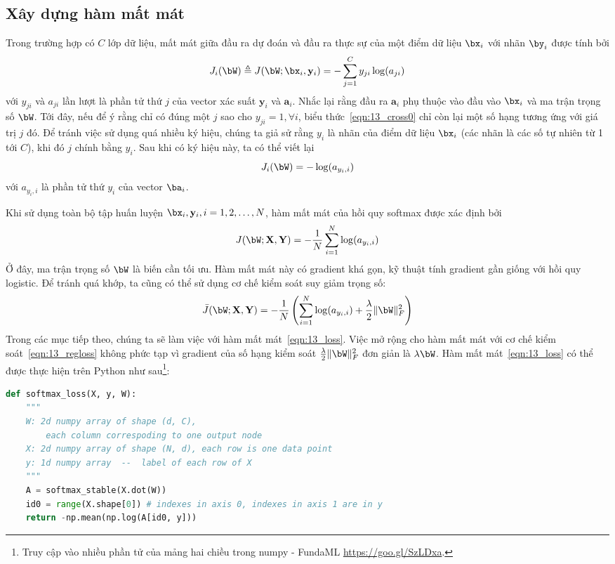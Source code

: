 \subsection{Xây dựng hàm mất mát} 
Trong trường hợp có $C$ lớp dữ liệu, {mất mát} giữa
đầu ra dự đoán và đầu ra thực sự của một điểm dữ liệu $\bx_i$ với
nhãn $\by_i$ được tính bởi
\begin{equation} 
\label{eqn:13_cross0}
J_i(\bW) \triangleq J(\bW;\bx_i, \mathbf{y}_i) = -\sum_{j=1}^C
y_{ji}\log(a_{ji})
\end{equation} 
với $y_{ji}$ và $ a_{ji}$ lần lượt là phần tử thứ $j$ của vector xác suất
$\mathbf{y}_i$ và $\mathbf{a}_i$. Nhắc lại rằng đầu ra $\mathbf{a}_i$ phụ thuộc vào đầu vào $\bx_i$ và ma trận trọng số $\bW$. 
Tới đây, nếu để ý rằng chỉ có đúng một $j$ sao cho $y_{ji} = 1, \forall i$, biểu
thức~\eqref{eqn:13_cross0} chỉ còn lại một số hạng tương ứng với giá trị $j$ đó.
Để tránh việc sử dụng quá nhiều ký hiệu, chúng ta giả sử rằng $y_i$ là nhãn
của điểm dữ liệu $\bx_i$ (các nhãn là các số tự nhiên từ 1 tới $C$), khi đó $j$
chính bằng $y_i$. Sau khi có
ký hiệu này, ta có thể viết lại
\begin{equation}
    J_i(\bW) = - \log(a_{y_i, i})
\end{equation}
với $a_{y_i, i}$ là phần tử thứ $y_i$ của vector $\ba_i$.

Khi sử dụng toàn bộ tập huấn luyện $\bx_i, \mathbf{y}_i, i = 1, 2, \dots, N$,
hàm mất mát của hồi quy softmax được xác định bởi
\begin{equation} 
\label{eqn:13_loss}
J(\bW; \mathbf{X}, \mathbf{Y}) = -\frac{1}{N}\sum_{i = 1}^N
\log(a_{y_i,i})
\end{equation} 
Ở đây, ma trận trọng số $\bW$ là biến cần tối ưu. Hàm mất mát này có gradient khá
gọn, kỹ thuật tính gradient gần giống với hồi quy logistic. Để tránh quá khớp, ta cũng có thể sử dụng cơ chế kiểm soát suy giảm trọng số:
\begin{equation}
\label{eqn:13_regloss}
     \bar{J}(\bW; \mathbf{X}, \mathbf{Y}) =
     -\frac{1}{N}\left(\sum_{i = 1}^N \log(a_{y_i,i}) + \frac{\lambda}{2} \|\bW\|_F^2 \right)
 \end{equation}
Trong các mục tiếp theo, chúng ta sẽ làm việc với hàm mất
mát~\eqref{eqn:13_loss}. Việc mở rộng cho hàm mất mát với
cơ chế kiểm soát~\eqref{eqn:13_regloss} không phức tạp vì gradient của số hạng
kiểm soát $\frac{\lambda}{2}\|\bW\|_F^2$ đơn giản là $\lambda \bW$. Hàm mất
mát~\eqref{eqn:13_loss} có thể được thực hiện trên Python như sau\footnote{{Truy cập vào nhiều phần tử của mảng hai
chiều trong numpy - FundaML} \url{https://goo.gl/SzLDxa}.}:
\begin{lstlisting}[language=Python]
def softmax_loss(X, y, W):
    """
    W: 2d numpy array of shape (d, C), 
        each column correspoding to one output node
    X: 2d numpy array of shape (N, d), each row is one data point
    y: 1d numpy array  --  label of each row of X 
    """
    A = softmax_stable(X.dot(W))
    id0 = range(X.shape[0]) # indexes in axis 0, indexes in axis 1 are in y
    return -np.mean(np.log(A[id0, y]))
\end{lstlisting}

